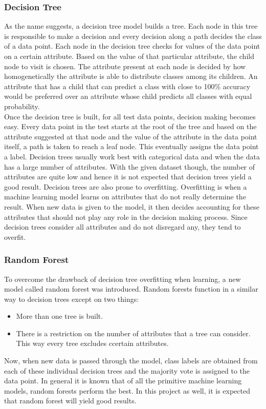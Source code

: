 \documentclass[11pt,a4paper]{article}
\begin{document}
\subsubsection{Decision Tree}
\label{dt}
As the name suggests, a decision tree model builds a tree. Each node in this tree is responsible to make a decision and every decision along a path decides the class of a data point. Each node in the decision tree checks for values of the data point on a certain attribute. Based on the value of that particular attribute, the child node to visit is chosen. The attribute present at each node is decided by how homogenetically the attribute is able to distribute classes among its children. An attribute that has a child that can predict a class with close to 100\% accuracy would be preferred over an attribute whose child predicts all classes with equal probability.\\
Once the decision tree is built, for all test data points, decision making becomes easy. Every data point in the test starts at the root of the tree and based on the attribute suggested at that node and the value of the attribute in the data point itself, a path is taken to reach a leaf node. This eventually assigns the data point a label. Decision trees usually work best with categorical data and when the data has a large number of attributes. With the given dataset though, the number of attributes are quite low and hence it is not expected that decision trees yield a good result. Decision trees are also prone to overfitting. Overfitting is when a machine learning model learns on attributes that do not really determine the result. When new data is given to the model, it then decides accounting for these attributes that should not play any role in the decision making process. Since decision trees consider all attributes and do not disregard any, they tend to overfit.

\subsubsection{Random Forest}
\label{rf}
To overcome the drawback of decision tree overfitting when learning, a new model called random forest was introduced. Random forests function in a similar way to decision trees except on two things:
\begin{itemize}
  \item More than one tree is built.
  \item There is a restriction on the number of attributes that a tree can consider. This way every tree excludes ccertain attributes.
\end{itemize}
Now, when new data is passed through the model, class labels are obtained from each of these individual decision trees and the majority vote is assigned to the data point. In general it is known that of all the primitive machine learning models, random forests perform the best. In this project as well, it is expected that random forest will yield good results.
\end{document}
